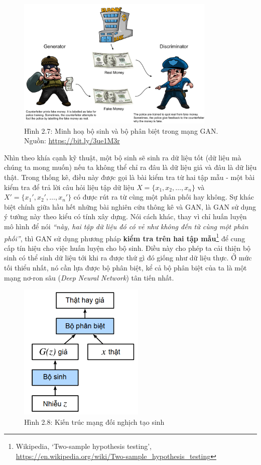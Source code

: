 \documentclass[a4paper]{article}
\begin{document}
\begin{figure}[h!]
\centering
\includegraphics[width=9.5cm]{images/2_7.png}
\caption{Hình 2.7: Minh hoạ bộ sinh và bộ phân biệt trong mạng GAN. Nguồn: \href{https://bit.ly/3ue1M3r}{https://bit.ly/3ue1M3r}}
\end{figure}

\noindent
Nhìn theo khía cạnh kỹ thuật, một bộ sinh sẽ sinh ra dữ liệu tốt (dữ liệu mà chúng ta mong muốn) nếu ta không thể chỉ ra đâu là dữ liệu giả và đâu là dữ liệu thật. Trong thống kê, điều này được gọi là bài kiểm tra từ hai tập mẫu - một bài kiểm tra để trả lời câu hỏi liệu tập dữ liệu $X = \{x_1, x_2, \dots, x_n\}$ và $X'=\{x_1', x_2', \dots, x_n'\}$ có được rút ra từ cùng một phân phối hay không. Sự khác biệt chính giữa hầu hết những bài nghiên cứu thông kê và GAN, là GAN sử dụng ý tưởng này theo kiểu có tính xây dựng. Nói cách khác, thay vì chỉ huấn luyện mô hình để nói \textit{``này, hai tập dữ liệu đó có vẻ như không đến từ cùng một phân phối''}, thì GAN sử dụng phương pháp \textbf{kiểm tra trên hai tập mẫu}\footnote{Wikipedia, \lq Two-sample hypothesis testing\rq, \href{https://en.wikipedia.org/wiki/Two-sample\_hypothesis\_testing}{https://en.wikipedia.org/wiki/Two-sample\_hypothesis\_testing}} để cung cấp tín hiệu cho việc huấn luyện cho bộ sinh. Điều này cho phép ta cải thiện bộ sinh có thể sinh dữ liệu tới khi ra được thứ gì đó giống như dữ liệu thực. Ở mức tối thiểu nhất, nó cần lựa được bộ phân biệt, kể cả bộ phân biệt của ta là một mạng nơ-ron sâu (\textit{Deep Neural Network}) tân tiến nhất.

\begin{figure}[h!]
\centering
\includegraphics[width=6cm]{images/2_71.PNG}
\caption{Hình 2.8: Kiến trúc mạng đối nghịch tạo sinh}
\end{figure}
\end{document}
